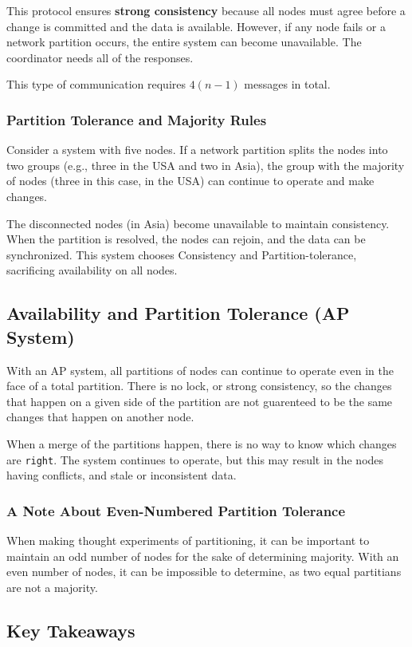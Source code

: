 \noindent This protocol ensures \textbf{strong consistency} because all nodes must agree before a change is committed   and the data is available. However, if any node fails or a network partition occurs, the entire system can become unavailable. The coordinator needs all of the responses.

\noindent This type of communication requires $4(n-1)$ messages in total.

\subsubsection{Partition Tolerance and Majority Rules}
Consider a system with five nodes. If a network partition splits the nodes into two groups (e.g., three in the USA and two in Asia), the group with the majority of nodes (three in this case, in the USA) can continue to operate and make changes.

The disconnected nodes (in Asia) become unavailable to maintain consistency. When the partition is resolved, the nodes can rejoin, and the data can be synchronized. This system chooses Consistency and Partition-tolerance, sacrificing availability on all nodes.


\subsection{Availability and Partition Tolerance (AP System)}
With an AP system, all partitions of nodes can continue to operate even in the face of a total partition. There is no lock, or strong consistency, so the changes that happen on a given side of the partition are not guarenteed to be the same changes that happen on another node.

When a merge of the partitions happen, there is no way to know which changes are \texttt{right}. The system continues to operate, but this may result in the nodes having conflicts, and stale or inconsistent data.


\subsubsection{A Note About Even-Numbered Partition Tolerance}
When making thought experiments of partitioning, it can be important to maintain an odd number of nodes for the sake of determining majority. With an even number of nodes, it can be impossible to determine, as two equal partitians are not a majority.

\subsection{Key Takeaways}


